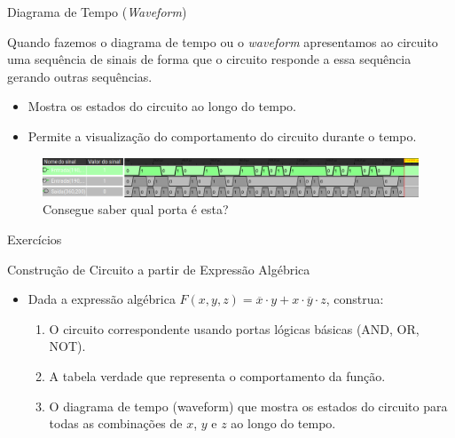 \begin{frame}{Diagrama de Tempo (\textit{Waveform})}
	\par Quando fazemos o diagrama de tempo ou o \textit{waveform} apresentamos ao circuito uma sequência de  sinais de forma que o circuito responde a essa sequência gerando outras sequências. 
	\begin{itemize}
		\item Mostra os estados do circuito ao longo do tempo.
		\item Permite a visualização do comportamento do circuito durante o tempo.
	\end{itemize}
	\begin{figure}
		\centering
		\includegraphics[width=\linewidth]{images/waveform01}
		\caption{Consegue saber qual porta é esta?}
		\label{fig:waveform01}
	\end{figure}
\end{frame}

\begin{frame}{Exercícios}
	\par Construção de Circuito a partir de Expressão Algébrica
	\begin{itemize}
		\item Dada a expressão algébrica \(F(x, y, z) = \overline{x} \cdot y + x \cdot \overline{y} \cdot z\), construa:
		\begin{enumerate}
			\item O circuito correspondente usando portas lógicas básicas (AND, OR, NOT).
			\item A tabela verdade que representa o comportamento da função.
			\item O diagrama de tempo (waveform) que mostra os estados do circuito para todas as combinações de \(x\), \(y\) e \(z\) ao longo do tempo.
		\end{enumerate}
	\end{itemize}
\end{frame}

